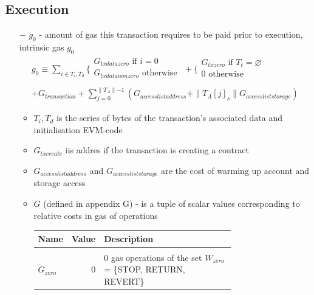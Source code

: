 \documentclass{article}
\begin{document}
\subsection{Execution}

\begin{itemize}
    \item[$-$] $g_0$ - amount of gas this transaction requires to be paid prior to execution, intrinsic gas $g_0$
    \begin{align*}     
        g_0 \equiv \sum_{i \in T_i, T_d} \biggl\{
            \begin{array}{ll}
                G_{txdatazero} \text{ if } i=0\\
                G_{txdatanonzero} \text{ otherwise }\\
            \end{array}
            + \biggl\{
                \begin{array}{ll}
                    G_{txzero} \text{ if } T_t = \varnothing \\
                    0 \text{ otherwise} \\
                \end{array} \\
            + G_{transaction} 
            + \sum_{j=0}^{\parallel T_A \parallel - 1} 
            (G_{accesslistaddress} 
            + \| T_A[j]_s \| G_{accessliststorage})
    \end{align*}
    \begin{itemize}
        \item $T_i, T_d$ is the series of bytes of the transaction's associated data and initialisation EVM-code
        \item $G_{txcreate}$ iis addres if the transaction is creating a contract
        \item $G_{accesslistaddress}$ and $G_{accessliststorage}$ are the cost of warming up account and storage access
        \item $G$ (defined in appendix G) - is a tuple of scalar values corresponding to relative costs in gas of operations 
        \begin{table}[ht!]
        \begin{center}
            \begin{tabular}{l r p{0.71\linewidth}}
                \hline
                Name & Value & Description \\
                \hline \\
                    $G_{zero}$ & $0$ & 0 gas operations of the set $W_{zero}$ = \{STOP, RETURN, REVERT\} \\

\end{tabular}
\end{center}
\end{table}
\end{itemize}
\end{itemize}
\end{document}
